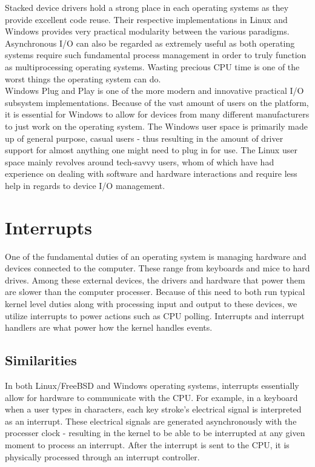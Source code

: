 \documentclass[letterpaper,10pt,titlepage]{article}
\begin{document}
Stacked device drivers hold a strong place in each operating systems as they provide excellent code reuse.  Their respective implementations in Linux and Windows provides very practical modularity between the various paradigms.  Asynchronous I/O can also be regarded as extremely useful as both operating systems require such fundamental process management in order to truly function as multiprocessing operating systems.  Wasting precious CPU time is one of the worst things the operating system can do.\\

Windows Plug and Play is one of the more modern and innovative practical I/O subsystem implementations.  Because of the vast amount of users on the platform, it is essential for Windows to allow for devices from many different manufacturers to just work on the operating system.  The Windows user space is primarily made up of general purpose, casual users - thus resulting in the amount of driver support for almost anything one might need to plug in for use.  The Linux user space mainly revolves around tech-savvy users, whom of which have had experience on dealing with software and hardware interactions and require less help in regards to device I/O management.\\

\section{Interrupts}

One of the fundamental duties of an operating system is managing hardware and devices connected to the computer.  These range from keyboards and mice to hard drives.  Among these external devices, the drivers and hardware that power them are slower than the computer processer.  Because of this need to both run typical kernel level duties along with processing input and output to these devices, we utilize interrupts to power actions such as CPU polling.  Interrupts and interrupt handlers are what power how the kernel handles events.\\

\subsection{Similarities}

In both Linux/FreeBSD and Windows operating systems, interrupts essentially allow for hardware to communicate with the CPU.  For example, in a keyboard when a user types in characters, each key stroke's electrical signal is interpreted as an interrupt.  These electrical signals are generated asynchronously with the processer clock - resulting in the kernel to be able to be interrupted at any given moment to process an interrupt.\cite{lkd7}  After the interrupt is sent to the CPU, it is physically processed through an interrupt controller.\\
\end{document}

